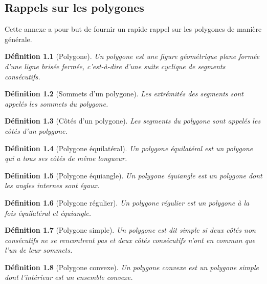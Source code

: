 \documentclass{book}
\newtheorem{definition}{Définition}
\begin{document}

\begin{appendices}
\chapter{Rappels sur les polygones}

{\noindent Cette annexe a pour but de fournir un rapide rappel sur les polygones de manière générale.}

\begin{definition}[Polygone]
Un polygone est une figure géométrique plane formée d'une ligne brisée fermée, c'est-à-dire d'une suite cyclique de segments consécutifs.
\end{definition}

\begin{definition}[Sommets d'un polygone]
Les extrémités des segments sont appelés les sommets du polygone.
\end{definition}

\begin{definition}[Côtés d'un polygone]
Les segments du polygone sont appelés les côtés d'un polygone.
\end{definition}

\begin{definition}[Polygone équilatéral]
Un polygone équilatéral est un polygone qui a tous ses côtés de même longueur.
\end{definition}

\begin{definition}[Polygone équiangle]
Un polygone équiangle est un polygone dont les angles internes sont égaux.
\end{definition}

\begin{definition}[Polygone régulier]
Un polygone régulier est un polygone à la fois équilatéral et équiangle.
\end{definition}

\begin{definition}[Polygone simple]
Un polygone est dit simple si deux côtés non consécutifs ne se rencontrent pas et deux côtés consécutifs n'ont en commun que l'un de leur sommets.
\end{definition}

\begin{definition}[Polygone convexe]
Un polygone convexe est un polygone simple dont l'intérieur est un ensemble convexe. 
\end{definition}


\end{appendices}
\end{document}
